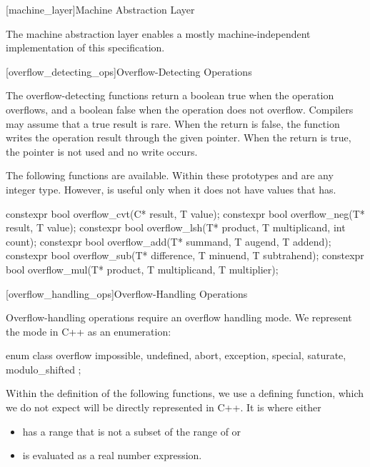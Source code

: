 \begin{addedblock}
[machine_layer]{Machine Abstraction Layer}

The machine abstraction layer enables a mostly machine-independent implementation of this specification.

[overflow_detecting_ops]{Overflow-Detecting Operations}

The overflow-detecting functions return a boolean true when the operation overflows, and a boolean false when the operation does not overflow. Compilers may assume that a true result is rare. When the return is false, the function writes the operation result through the given pointer. When the return is true, the pointer is not used and no write occurs.

The following functions are available. Within these prototypes  and  are any integer type. However,  is useful only when it does not have values that  has.

\begin{codeblock}
constexpr bool overflow_cvt(C* result, T value);
constexpr bool overflow_neg(T* result, T value);
constexpr bool overflow_lsh(T* product, T multiplicand, int count);
constexpr bool overflow_add(T* summand, T augend, T addend);
constexpr bool overflow_sub(T* difference, T minuend, T subtrahend);
constexpr bool overflow_mul(T* product, T multiplicand, T multiplier);
\end{codeblock}

[overflow_handling_ops]{Overflow-Handling Operations}

Overflow-handling operations require an overflow handling mode. We represent the mode in C++ as an enumeration:

\begin{codeblock}
enum class overflow {
  impossible, undefined, abort, exception,
  special,
  saturate, modulo_shifted
};
\end{codeblock}

Within the definition of the following functions, we use a defining function, which we do not expect will be directly represented in C++. It is  where  either
\begin{itemize}
\item has a range that is not a subset of the range of  or
\item is evaluated as a real number expression.
\end{itemize}


\end{addedblock}
